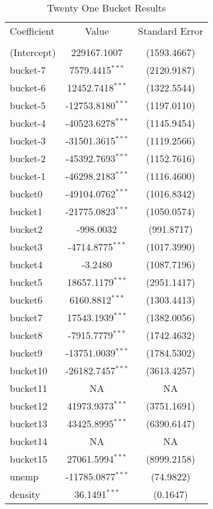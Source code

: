 \documentclass[12pt]{article}
\begin{document}
\begin{table}[!htbp] \centering 
  \caption{Twenty One Bucket Results} 
  \label{} 
\begin{tabular}{@{\extracolsep{5pt}}lcc}\\[-1.8ex] \\ \hline
Coefficient & Value & Standard Error \\  
\hline \\[-1.8ex]
(Intercept) & 229167.1007 & (1593.4667) \\
bucket-7  & 7579.4415$^{***}$   & (2120.9187) \\
bucket-6  & 12452.7418$^{***}$ & (1322.5544) \\
bucket-5  & -12753.8180$^{***}$ & (1197.0110) \\
bucket-4  & -40523.6278$^{***}$ & (1145.9454) \\
bucket-3  & -31501.3615$^{***}$ & (1119.2566) \\
bucket-2  & -45392.7693$^{***}$ & (1152.7616) \\
bucket-1  & -46298.2183$^{***}$ & (1116.4600) \\
bucket0   & -49104.0762$^{***}$ & (1016.8342) \\
bucket1   & -21775.0823$^{***}$ & (1050.0574) \\
bucket2   & -998.0032 & (991.8717) \\
bucket3   & -4714.8775$^{***}$ & (1017.3990) \\
bucket4   & -3.2480 & (1087.7196) \\
bucket5   & 18657.1179$^{***}$ & (2951.1417) \\ 
bucket6   & 6160.8812$^{***}$ & (1303.4413) \\ 
bucket7   &  17543.1939$^{***}$ & (1382.0056) \\
bucket8   &  -7915.7779$^{***}$ & (1742.4632) \\
bucket9   &  -13751.0039$^{***}$ & (1784.5302) \\
bucket10  &  -26182.7457$^{***}$ & (3613.4257) \\
bucket11  &   NA  &  NA \\
bucket12  &  41973.9373$^{***}$ & (3751.1691) \\
bucket13  &  43425.8995$^{***}$ & (6390.6147) \\
bucket14  &   NA  &  NA  \\
bucket15  &  27061.5994$^{***}$ & (8999.2158) \\
unemp     &   -11785.0877$^{***}$& (74.9822) \\
density   &       36.1491$^{***}$& (0.1647) \\
\hline
\end{tabular}
\end{table}
\end{document}
